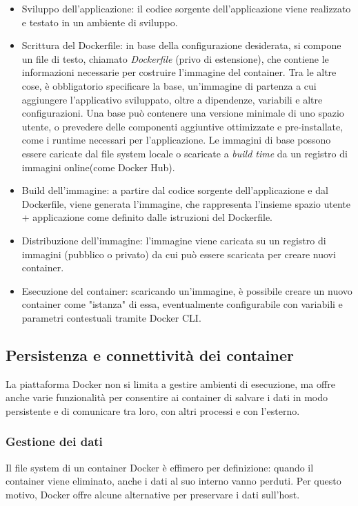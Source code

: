 \begin{itemize}
  \item Sviluppo dell'applicazione: il codice sorgente dell'applicazione viene realizzato e testato in un ambiente di sviluppo.
  \item Scrittura del Dockerfile: in base della configurazione desiderata, si compone un file di testo, chiamato \emph{Dockerfile} (privo di estensione), che contiene le informazioni necessarie per costruire l'immagine del container. Tra le altre cose, è obbligatorio specificare la base, un'immagine di partenza a cui aggiungere l'applicativo sviluppato, oltre a dipendenze, variabili e altre configurazioni. Una base può contenere una versione minimale di uno spazio utente, o prevedere delle componenti aggiuntive ottimizzate e pre-installate, come i runtime necessari per l'applicazione. Le immagini di base possono essere caricate dal file system locale o scaricate a \emph{build time} da un registro di immagini online(come Docker Hub).
  \item Build dell'immagine: a partire dal codice sorgente dell'applicazione e dal Dockerfile, viene generata l'immagine, che rappresenta l'insieme spazio utente + applicazione come definito dalle istruzioni del Dockerfile.
  \item Distribuzione dell'immagine: l'immagine viene caricata su un registro di immagini (pubblico o privato) da cui può essere scaricata per creare nuovi container.
  \item Esecuzione del container: scaricando un'immagine, è possibile creare un nuovo container come "istanza" di essa, eventualmente configurabile con variabili e parametri contestuali tramite Docker CLI.
\end{itemize}

\subsection{Persistenza e connettività dei container}
La piattaforma Docker non si limita a gestire ambienti di esecuzione, ma offre anche varie funzionalità per consentire ai container di salvare i dati in modo persistente e di comunicare tra loro, con altri processi e con l'esterno.

\subsubsection{Gestione dei dati}
Il file system di un container Docker è effimero per definizione: quando il container viene eliminato, anche i dati al suo interno vanno perduti. Per questo motivo, Docker offre alcune alternative per preservare i dati sull'host.

